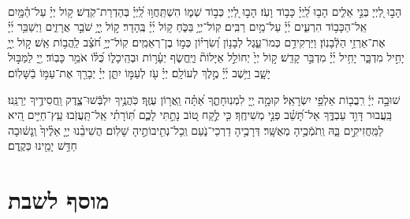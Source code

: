 \documentclass[twoside, openany, parskip=half, 11pt]{book}
\begin{document}
\\
הָב֣וּ לַ֭יְיָ בְּנֵ֣י אֵלִ֑ים הָב֥וּ לַֽ֝יְיָ֗ כָּב֥וֹד וָעֹֽז׃ 
הָב֣וּ לַ֭יְיָ כְּב֣וֹד שְׁמ֑וֹ הִשְׁתַּֽחֲו֥וּ לַֽ֝יְיָ֗ בְּהַדְרַת־קֹֽדֶשׁ׃ 
ק֥וֹל יְיָ֗ עַל־הַ֫מָּ֥יִם אֵֽל־הַכָּב֥וֹד הִרְעִ֑ים יְ֜יָ֗ עַל־מַ֥יִם רַבִּֽים׃ 
קֽוֹל־יְיָ֥ בַּכֹּ֑חַ ק֥וֹל יְ֜יָ֗ בֶּֽהָדָר׃ 
ק֣וֹל יְ֖יָ֥ שֹׁבֵ֣ר אֲרָזִ֑ים וַיְשַׁבֵּ֥ר יְ֜יָ֗ אֶת־אַרְזֵ֥י הַלְּֿבָנֽוֹן׃ 
וַיַּרְקִידֵ֥ם כְּמוֹ־עֵ֑גֶל לְבָנ֥וֹן וְ֝שִׂרְי֗וֹן כְּמ֣וֹ בֶן־רְאֵמִֽים׃ 
קֽוֹל־יְיָ֥ חֹ֝צֵ֗ב לַֽהֲב֥וֹת אֵֽשׁ׃ 
ק֣וֹל יְ֖יָ֥ יָחִ֣יל מִדְבָּ֑ר יָחִ֥יל יְ֜יָ֗ מִדְבַּ֣ר קָדֵֽשׁ׃ 
ק֣וֹל יְיָ֙ יְחוֹלֵ֣ל אַיָּלוֹת֘ וַיֶּֽחֱשׂ֢ף יְעָ֫ר֥וֹת וּבְהֵֽיכָל֑וֹ כֻּ֝לּ֗וֹ אֹמֵ֥ר כָּבֽוֹד׃ 
יְ֖יָ לַמַּבּ֣וּל יָשָׁ֑ב וַיֵּ֥שֶׁב יְ֜יָ֗ מֶ֣לֶךְ לְעוֹלָֽם׃ 
יְיָ֗ עֹ֖ז לְעַמּ֣וֹ יִתֵּ֑ן יְיָ֓ יְבָרֵ֖ךְ אֶת־עַמּ֣וֹ בַֿשָּׁלֽוֹם׃



 
שׁוּבָ֣ה יְיָ֔ רִֽבֲב֖וֹת אַלְפֵ֥י יִשְׂרָאֵֽל׃ 
קוּמָ֣ה יְ֖יָ לִמְנֽוּחָתֶ֑ךָ אַ֝תָּ֗ה וַֽאֲר֥וֹן עֻזֶּֽךָ׃ 
כֹּֽהֲנֶ֥יךָ יִלְבְּֿשׁוּ־צֶ֑דֶק וַֽחֲסִידֶ֥יךָ יְרַנֵּֽנוּ׃ 
בַּֽעֲבוּר דָּוִ֣ד עַבְדֶּ֑ךָ אַל־תָּ֝שֵׁ֗ב פְּנֵ֣י מְשִׁיחֶֽךָ׃ 
כִּ֤י לֶ֣קַח ט֭וֹב נָתַ֣תִּי לָכֶ֑ם תּֽ֝וֹרָתִ֗י אַֽל־תַּֽעֲזֹֽבוּ׃ 
עֵֽץ־חַיִּ֣ים הִ֭יא לַמַּֽחֲזִיקִ֣ים בָּ֑הּ וְֽתֹמְֿכֶ֥יהָ מְאֻשָּֽׁר׃ 
דְּרָכֶ֥יהָ דַרְכֵי־נֹ֑עַם 	וְֽכָל־נְתִ֖יבוֹתֶ֣יהָ שָׁלֽוֹם׃ 
הֲשִׁיבֵ֨נוּ יְיָ֤ אֵלֶ֨יךָ֙ וְֽנָשׁ֔וּבָה חַדֵּ֥שׁ יָמֵ֖ינוּ כְּקֶֽדֶם׃

\clearpage

\halfkaddish


\pageref{musaphregel}


\section[מוסף לשבת]{ מוסף לשבת }

\shabbosavos

\shabbosmechayey

\end{document}
